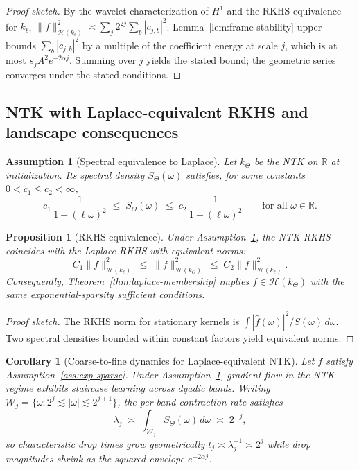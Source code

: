 \documentclass[11pt]{article}
\newtheorem{assumption}{Assumption}
\newtheorem{proposition}{Proposition}
\newtheorem{corollary}{Corollary}
\theoremstyle{remark}
\begin{document}
\begin{proof}[Proof sketch]
By the wavelet characterization of $H^1$ and the RKHS equivalence for $k_\ell$, 
$\|f\|_{\mathcal{H}(k_\ell)}^2 \asymp \sum_j 2^{2j} \sum_b |c_{j,b}|^2$. Lemma~\ref{lem:frame-stability} upper-bounds $\sum_b |c_{j,b}|^2$ by a multiple of the coefficient energy at scale $j$, which is at most $s_j A^2 e^{-2\alpha j}$. Summing over $j$ yields the stated bound; the geometric series converges under the stated conditions.
\end{proof}

\subsection{NTK with Laplace-equivalent RKHS and landscape consequences}
\begin{assumption}[Spectral equivalence to Laplace]\label{ass:spectral-equivalence}
Let $k_\Theta$ be the NTK on $\mathbb{R}$ at initialization. Its spectral density $S_\Theta(\omega)$ satisfies, for some constants $0<c_1\le c_2<\infty$,
\[
c_1\, \frac{1}{1 + (\ell \omega)^2} \;\le\; S_\Theta(\omega) \;\le\; c_2\, \frac{1}{1 + (\ell \omega)^2}
\qquad \text{for all } \omega \in \mathbb{R}.
\]
\end{assumption}

\begin{proposition}[RKHS equivalence]\label{prop:rkhs-equiv-laplace}
Under Assumption~\ref{ass:spectral-equivalence}, the NTK RKHS coincides with the Laplace RKHS with equivalent norms:
\[
C_1 \|f\|_{\mathcal{H}(k_\ell)}^2 \;\le\; \|f\|_{\mathcal{H}(k_\Theta)}^2 \;\le\; C_2 \|f\|_{\mathcal{H}(k_\ell)}^2.
\]
Consequently, Theorem~\ref{thm:laplace-membership} implies $f \in \mathcal{H}(k_\Theta)$ with the same exponential-sparsity sufficient conditions.
\end{proposition}

\begin{proof}[Proof sketch]
The RKHS norm for stationary kernels is $\int |\widehat f(\omega)|^2 / S(\omega)\,d\omega$. Two spectral densities bounded within constant factors yield equivalent norms.
\end{proof}

\begin{corollary}[Coarse-to-fine dynamics for Laplace-equivalent NTK]\label{cor:landscape}
Let $f$ satisfy Assumption~\ref{ass:exp-sparse}. Under Assumption~\ref{ass:spectral-equivalence}, gradient-flow in the NTK regime exhibits staircase learning across dyadic bands. Writing $\mathcal{W}_j = \{\omega: 2^{j}\!\lesssim\!|\omega|\!\lesssim\!2^{j+1}\}$, the per-band contraction rate satisfies
\[
\lambda_j \;\asymp\; \int_{\mathcal{W}_j} S_\Theta(\omega)\, d\omega \;\asymp\; 2^{-j},
\]
so characteristic drop times grow geometrically $t_j \asymp \lambda_j^{-1} \asymp 2^{j}$ while drop magnitudes shrink as the squared envelope $e^{-2\alpha j}$.
\end{corollary}
\end{document}
